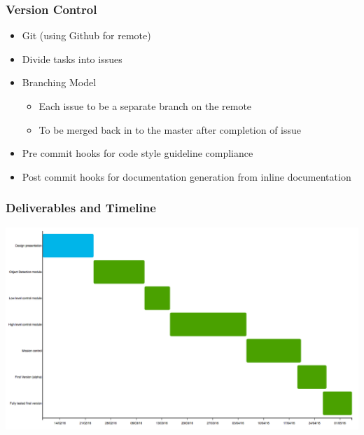 \documentclass{beamer}
\begin{document}
\begin{frame}
\frametitle{Version Control}
\begin{itemize}
\item Git (using Github for remote)
\item Divide tasks into issues
\item Branching Model
\begin{itemize}
\item Each issue to be a separate branch on the remote
\item To be merged back in to the master after completion of issue
\end{itemize}
\item Pre commit hooks for code style guideline compliance
\item Post commit hooks for documentation generation from inline documentation
\end{itemize}
\end{frame}

\begin{frame}
\frametitle{Deliverables and Timeline}
\includegraphics[scale=0.23]{assets/gannt/chart.png}
\end{frame}

\end{document}
